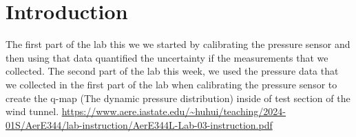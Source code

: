 \chapter{Introduction}
\label{cp:introduction}
The first part of the lab this we we started by calibrating the pressure sensor and then using that data quantified the uncertainty if the measurements that we collected. The second part of the lab this week, we used the pressure data that we collected in the first part of the lab when calibrating the pressure sensor to create the q-map (The dynamic pressure distribution) inside of test section of the wind tunnel. \url{https://www.aere.iastate.edu/~huhui/teaching/2024-01S/AerE344/lab-instruction/AerE344L-Lab-03-instruction.pdf}